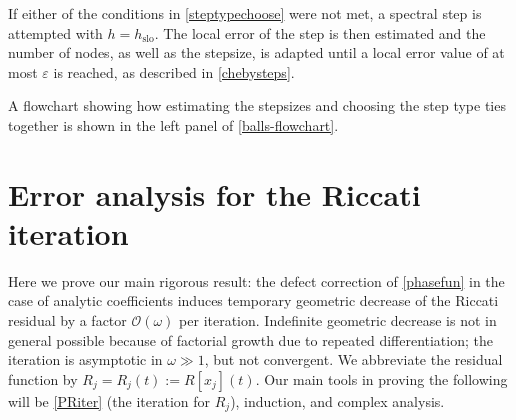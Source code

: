 \documentclass[10pt]{article}
\newcommand{\bigO}{{\mathcal O}}
\newcommand{\om}{\omega}
\begin{document}
If either of the conditions in \cref{steptypechoose} were not met, a spectral
step is attempted with $h = h_{\text{slo}}$. The local error of the step is
then estimated and the number of nodes, as well as the stepsize, is
adapted until a local error value of at most $\varepsilon$ is reached, as described in
\cref{chebysteps}.

A flowchart showing how estimating the stepsizes and choosing the step type ties
together is shown in the left panel of \cref{balls-flowchart}.


\section{Error analysis for the Riccati iteration\label{errorana}}

Here we prove our main rigorous result:
the defect correction of \cref{phasefun}
in the case of analytic coefficients induces
temporary geometric decrease of the Riccati residual by a factor $\bigO(\om)$ per iteration.
Indefinite geometric decrease is not in general possible because of
factorial growth due to repeated differentiation;
the iteration is asymptotic in $\om\gg 1$, but not convergent.
We abbreviate the residual function by $R_j = R_j(t) := R[x_j](t)$.
Our main tools in proving the following will be \cref{PRiter} (the iteration for $R_j$), induction, and complex analysis.


\end{document}
